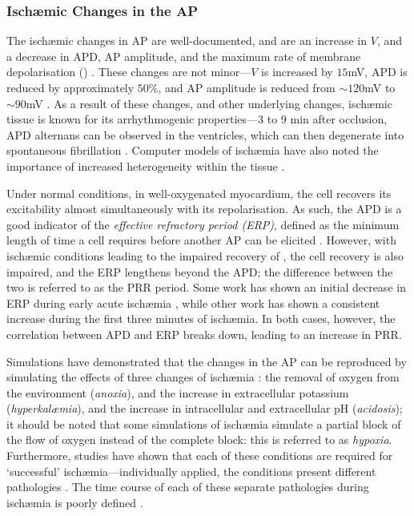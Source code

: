 \documentclass[../thesis-main.tex]{subfiles}
\begin{document}
\subsubsection{Isch\ae{}mic Changes in the AP}
\label{subsubsec:isch-ap}
The isch\ae{}mic changes in AP are well-documented, and are an increase in $V$, and a decrease in APD, AP amplitude, and the maximum rate of membrane depolarisation (\dvdtmax{}) \citep{Carmeliet1999, Weiss1982, Weiss1992, Kleber1987a, Barrett1997, Janse2001}. These changes are not minor---$V$ is increased by $15$mV, APD is reduced by approximately $50\%$, and AP amplitude is reduced from $\sim120$mV to $\sim90$mV \citep{Rodriguez2002}. As a result of these changes, and other underlying changes, isch\ae{}mic tissue is known for its arrhythmogenic properties---3 to 9 min after occlusion, APD alternans can be observed in the ventricles, which can then degenerate into spontaneous fibrillation \citep{Downar1977}. Computer models of isch\ae{}mia have also noted the importance of increased heterogeneity within the tissue \citep{Avitall1979, Behrens1997}.

Under normal conditions, in well-oxygenated myocardium, the cell recovers its excitability almost simultaneously with its repolarisation. As such, the APD is a good indicator of the \emph{effective refractory period (ERP)}, defined as the minimum length of time a cell requires before another AP can be elicited \citep{Huang2004}. However, with isch\ae{}mic conditions leading to the impaired recovery of \ina{}, the cell recovery is also impaired, and the ERP lengthens beyond the APD; the difference between the two is referred to as the PRR period. Some work has shown an initial decrease in ERP during early acute isch\ae{}mia \citep{Downar1977}, while other work has shown a consistent increase \citep{Sutton2000} during the first three minutes of isch\ae{}mia. In both cases, however, the correlation between APD and ERP breaks down, leading to an increase in PRR.

Simulations have demonstrated that the changes in the AP can be reproduced by simulating the effects of three changes of isch\ae{}mia \citep{Shaw1997, Shaw1997a, Ferrero1996, Rodriguez2004}: the removal of oxygen from the environment (\emph{anoxia}), and the increase in extracellular potassium (\emph{hyperkal\ae{}mia}), and the increase in intracellular and extracellular pH (\emph{acidosis}); it should be noted that some simulations of isch\ae{}mia simulate a partial block of the flow of oxygen instead of the complete block: this is referred to as \emph{hypoxia}. Furthermore, studies have shown that each of these conditions are required for `successful' isch\ae{}mia---individually applied, the conditions present different pathologies \citep{Rodriguez2006, Sharma1983}. The time course of each of these separate pathologies during isch\ae{}mia is poorly defined \citep{Niederer2013}.
\end{document}
